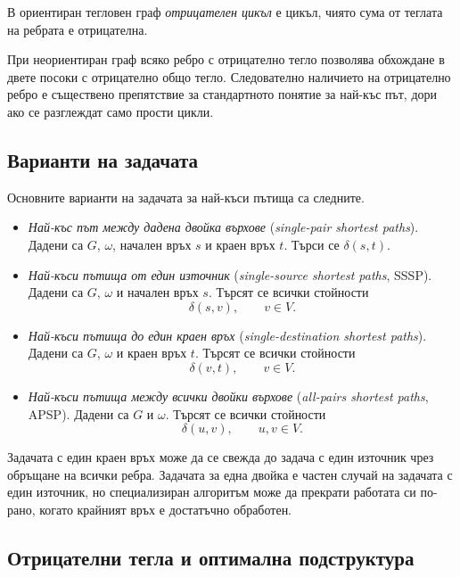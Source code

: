 \begin{defn}
В ориентиран тегловен граф \emph{отрицателен цикъл} е цикъл, чиято сума от теглата на ребрата е отрицателна.
\end{defn}

\begin{supp}[Бележка]
При неориентиран граф всяко ребро с отрицателно тегло позволява обхождане в двете посоки с отрицателно общо тегло. Следователно наличието на отрицателно ребро е съществено препятствие за стандартното понятие за най-къс път, дори ако се разглеждат само прости цикли.
\end{supp}

\subsection{Варианти на задачата}\label{s:8.1.1}

Основните варианти на задачата за най-къси пътища са следните.

\begin{itemize}
\item \emph{Най-къс път между дадена двойка върхове} (\emph{single-pair shortest paths}). Дадени са $G$, $\omega$, начален връх $s$ и краен връх $t$. Търси се $\delta(s,t)$.

\item \emph{Най-къси пътища от един източник} (\emph{single-source shortest paths}, SSSP). Дадени са $G$, $\omega$ и начален връх $s$. Търсят се всички стойности
\[
\delta(s,v),\qquad v\in V.
\]

\item \emph{Най-къси пътища до един краен връх} (\emph{single-destination shortest paths}). Дадени са $G$, $\omega$ и краен връх $t$. Търсят се всички стойности
\[
\delta(v,t),\qquad v\in V.
\]

\item \emph{Най-къси пътища между всички двойки върхове} (\emph{all-pairs shortest paths}, APSP). Дадени са $G$ и $\omega$. Търсят се всички стойности
\[
\delta(u,v),\qquad u,v\in V.
\]
\end{itemize}

Задачата с един краен връх може да се свежда до задача с един източник чрез обръщане на всички ребра. Задачата за една двойка е частен случай на задачата с един източник, но специализиран алгоритъм може да прекрати работата си по-рано, когато крайният връх е достатъчно обработен.

\subsection{Отрицателни тегла и оптимална подструктура}\label{s:8.1.2}

